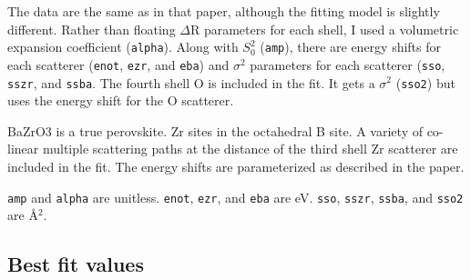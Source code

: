 \documentclass[11pt]{article}
\begin{document}
The data are the same as in that paper, although the fitting model is
slightly different. Rather than floating $\Delta$R parameters for each
shell, I used a volumetric expansion coefficient
(\texttt{alpha}). Along with $S_0^2$ (\texttt{amp}), there are energy
shifts for each scatterer (\texttt{enot}, \texttt{ezr}, and
\texttt{eba}) and $\sigma^2$ parameters for each scatterer
(\texttt{sso}, \texttt{sszr}, and \texttt{ssba}.  The fourth shell O
is included in the fit. It gets a $\sigma^2$ (\texttt{sso2}) but uses
the energy shift for the O scatterer.

BaZrO3 is a true perovskite. Zr sites in the octahedral B site. A
variety of co-linear multiple scattering paths at the distance of the
third shell Zr scatterer are included in the fit. The energy shifts are
parameterized as described in the paper.

\texttt{amp} and \texttt{alpha} are unitless. \texttt{enot}, \texttt{ezr}, and \texttt{eba} are eV. \texttt{sso},
\texttt{sszr}, \texttt{ssba}, and \texttt{sso2} are {\AA}$^2$.

\subsection{Best fit values}
\label{sec:orgheadline26}
\end{document}
